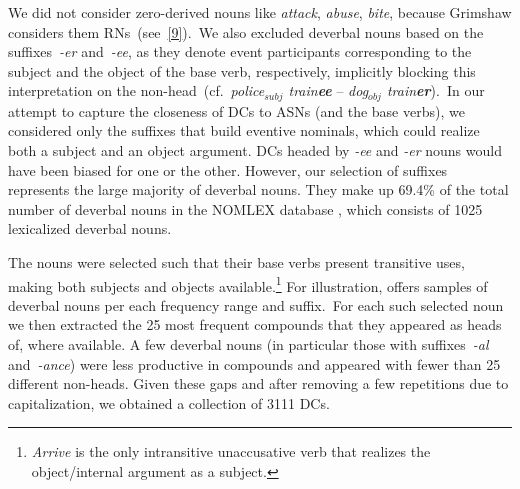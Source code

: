 \documentclass[output=paper]{langsci/langscibook}
\begin{document}
We  {did not} consider zero-derived nouns like \textit{attack}, \textit{abuse}, \textit{bite}, because Grimshaw considers them RNs~(see~\ref{9}).\ 
We also excluded deverbal nouns based on the suffixes~\mbox{\textit{-er}} and~\mbox{\textit{-ee}}, as they denote event participants corresponding to the subject and the object of the base verb, respectively, implicitly blocking this interpretation on the non-head~(cf.\ \textit{police$_{subj}$ train\textbf{ee}} -- \textit{dog$_{obj}$ train\textbf{er}}).\ In our attempt to capture the closeness of DCs to ASNs (and the base verbs), we considered only the suffixes that build eventive nominals, which could realize both a subject and an object argument. DCs headed by \textit{-ee} and \textit{-er} nouns would have been biased for one or the other. However, our selection of suffixes represents the large majority of deverbal nouns. They make up 69.4\% of the total number of deverbal nouns in the NOMLEX database \citep{NOMLEX:98}, which consists of 1025 lexicalized deverbal nouns.


The nouns were selected such that their base verbs present transitive uses, making both subjects and objects available.\footnote{\textit{Arrive} is the only intransitive unaccusative verb that realizes the object/internal argument as a subject.} For illustration,  offers  samples of deverbal nouns per each frequency range and suffix.\ For each such selected noun we then extracted the 25 most frequent compounds that they appeared as heads of, where available. A few deverbal nouns (in particular those with suffixes~\mbox{\textit{-al}} and~\mbox{\textit{-ance}}) were less productive in compounds and appeared with fewer than 25 different non-heads. Given these gaps and after removing a few repetitions due to capitalization, we obtained a collection of 3111 DCs.
\end{document}
